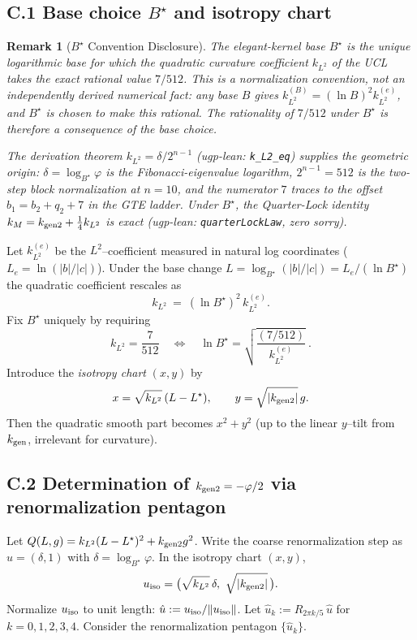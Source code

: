\documentclass[12pt]{article}
\newtheorem{remark}[theorem]{Remark}
\numberwithin{equation}{section}
\begin{document}
\subsection*{C.1 \; Base choice $B^\star$ and isotropy chart}

\begin{remark}[$B^\star$ Convention Disclosure]\label{rem:bstar-convention}
The \emph{elegant-kernel base} $B^\star$ is the unique logarithmic base for which the quadratic curvature coefficient $k_{L^2}$ of the UCL takes the exact rational value $7/512$. This is a \emph{normalization convention}, not an independently derived numerical fact: any base $B$ gives $k_{L^2}^{(B)}=(\ln B)^2 k_{L^2}^{(e)}$, and $B^\star$ is chosen to make this rational. The rationality of $7/512$ under $B^\star$ is therefore a consequence of the base choice.

The derivation theorem $k_{L^2} = \delta/2^{n-1}$ (ugp-lean: \texttt{k\_L2\_eq}) supplies the geometric origin: $\delta = \log_{B^\star}\varphi$ is the Fibonacci-eigenvalue logarithm, $2^{n-1}=512$ is the two-step block normalization at $n=10$, and the numerator $7$ traces to the offset $b_1 = b_2 + q_2 + 7$ in the GTE ladder. Under $B^\star$, the Quarter-Lock identity $k_M = k_{\rm gen2} + \tfrac14 k_{L^2}$ is exact (ugp-lean: \texttt{quarterLockLaw}, zero sorry).
\end{remark}

Let $k_{L^2}^{(e)}$ be the $L^2$–coefficient measured in natural log coordinates ($L_e=\ln(|b|/|c|)$).  Under the base change $L=\log_{B^\star}(|b|/|c|)=L_e/(\ln B^\star)$ the quadratic coefficient rescales as
\[
k_{L^2}\ =\ (\ln B^\star)^2\,k_{L^2}^{(e)}.
\]
Fix $B^\star$ uniquely by requiring
\[
\boxed{\quad k_{L^2}=\frac{7}{512}\quad\Longleftrightarrow\quad
\ln B^\star=\sqrt{\frac{(7/512)}{\,k_{L^2}^{(e)}\,}}\ .\quad}
\]
Introduce the \emph{isotropy chart} $(x,y)$ by
\[
x=\sqrt{k_{L^2}}\,(L-L^\star),\qquad y=\sqrt{|k_{\rm gen2}|}\,g.
\]
Then the quadratic smooth part becomes $x^2+y^2$ (up to the linear $y$–tilt from $k_{\rm gen}$, irrelevant for curvature).

\bigskip
\subsection*{C.2 \; Determination of $k_{\rm gen2}=-\varphi/2$ via renormalization pentagon}

Let $Q(L,g)=k_{L^2}(L-L^\star)^2+k_{\rm gen2}g^2$. Write the coarse renormalization step as $u=(\delta,1)$ with $\delta=\log_{B^\star}\varphi$. In the isotropy chart $(x,y)$,
\[
  u_{\rm iso}=\big(\sqrt{k_{L^2}}\,\delta,\ \sqrt{|k_{\rm gen2}|}\,\big).
\]
Normalize $u_{\rm iso}$ to unit length: $\hat u:=u_{\rm iso}/\|u_{\rm iso}\|$. Let $\hat u_k:=R_{2\pi k/5}\,\hat u$ for $k=0,1,2,3,4$. Consider the renormalization pentagon $\{\hat u_k\}$.
\end{document}
